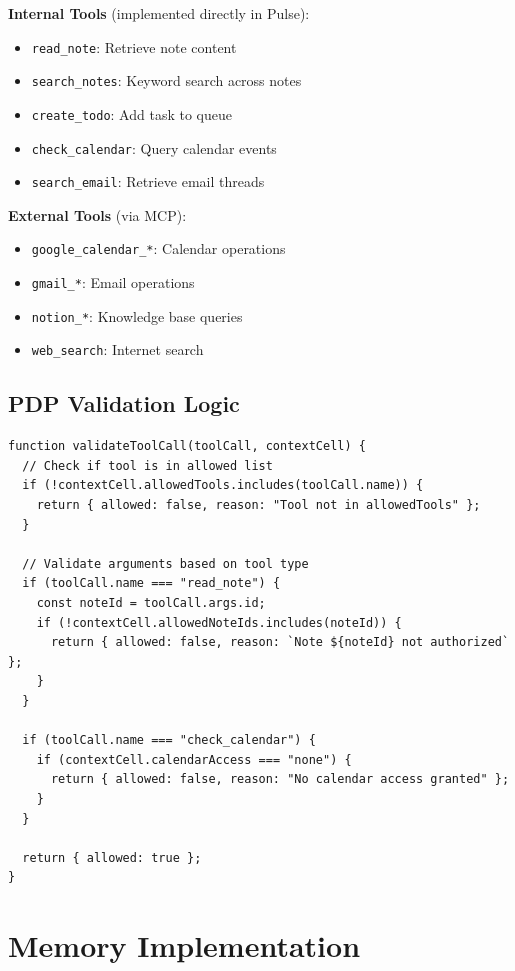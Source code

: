 \textbf{Internal Tools} (implemented directly in Pulse):
\begin{itemize}
    \item \texttt{read\_note}: Retrieve note content
    \item \texttt{search\_notes}: Keyword search across notes
    \item \texttt{create\_todo}: Add task to queue
    \item \texttt{check\_calendar}: Query calendar events
    \item \texttt{search\_email}: Retrieve email threads
\end{itemize}

\textbf{External Tools} (via MCP):
\begin{itemize}
    \item \texttt{google\_calendar\_*}: Calendar operations
    \item \texttt{gmail\_*}: Email operations
    \item \texttt{notion\_*}: Knowledge base queries
    \item \texttt{web\_search}: Internet search
\end{itemize}

\subsection{PDP Validation Logic}

\begin{verbatim}
function validateToolCall(toolCall, contextCell) {
  // Check if tool is in allowed list
  if (!contextCell.allowedTools.includes(toolCall.name)) {
    return { allowed: false, reason: "Tool not in allowedTools" };
  }

  // Validate arguments based on tool type
  if (toolCall.name === "read_note") {
    const noteId = toolCall.args.id;
    if (!contextCell.allowedNoteIds.includes(noteId)) {
      return { allowed: false, reason: `Note ${noteId} not authorized` };
    }
  }

  if (toolCall.name === "check_calendar") {
    if (contextCell.calendarAccess === "none") {
      return { allowed: false, reason: "No calendar access granted" };
    }
  }

  return { allowed: true };
}
\end{verbatim}

\section{Memory Implementation}

